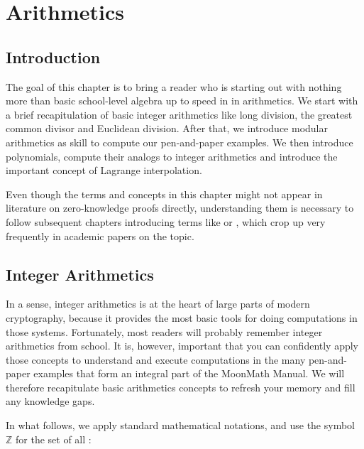 \chapter{Arithmetics}\label{chap:arithmetics}

\section{Introduction}

The goal of this chapter is to bring a reader who is starting out with nothing more than basic school-level algebra up to speed in in arithmetics. We start with a brief recapitulation of basic integer arithmetics like long division, the greatest common divisor and Euclidean division. After that, we introduce modular arithmetics as  skill to compute our pen-and-paper examples. We then introduce polynomials, compute their analogs to integer arithmetics and introduce the important concept of Lagrange interpolation.

Even though the terms and concepts in this chapter might not appear in literature on zero-knowledge proofs directly, understanding them is necessary to follow subsequent chapters introducing terms like  or , which crop up very frequently in academic papers on the topic.

\section{Integer Arithmetics}
\label{integer_arithmetics}
In a sense, integer arithmetics is at the heart of large parts of modern cryptography, because it provides the most basic tools for doing computations in those systems. Fortunately, most readers will probably remember integer arithmetics from school. It is, however, important that you can confidently apply those concepts to understand and execute computations in the many pen-and-paper examples that form an integral part of the MoonMath Manual. We will therefore recapitulate basic arithmetics concepts to refresh your memory and fill any knowledge gaps.

In what follows, we apply standard mathematical notations, and use the symbol $\mathbb{Z}$ for the set of all : 

